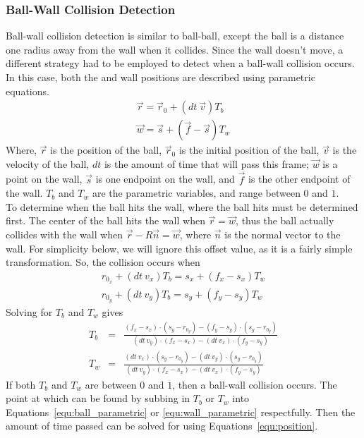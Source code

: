 \documentclass[12pt]{article}
\begin{document}
            \subsubsection{Ball-Wall Collision Detection}
            Ball-wall collision detection is similar to ball-ball, except the ball is a distance one radius away from the wall when it collides.
            Since the wall doesn't move, a different strategy had to be employed to detect when a ball-wall collision occurs. In this case,
            both the and wall positions are described using parametric equations.
            \begin{eqnarray}
                \vec r = \vec r_0 + (dt~\vec v) T_b         \label{equ:ball_parametric} \\
                \vec w = \vec s + (\vec f - \vec s) T_w     \label{equ:wall_parametric}
            \end{eqnarray}
            Where, $\vec r$ is the position of the ball, $\vec r_0$ is the initial position of the ball, $\vec v$ is the velocity of the ball,
            $dt$ is the amount of time that will pass this frame; $\vec w$ is a point on the wall, $\vec s$ is one endpoint on the wall, and $\vec f$
            is the other endpoint of the wall. $T_b$ and $T_w$ are the parametric variables, and range between $0$ and $1$. \\
            To determine when the ball hits the wall, where the ball hits must be determined first. The center of the ball hits the wall when
            $\vec r = \vec w$, thus the ball actually collides with the wall when $\vec r - R \vec n = \vec w$, where $\vec n$ is the normal
            vector to the wall. For simplicity below, we will ignore this offset value, as it is a fairly simple transformation. So, the collision
            occurs when
            \begin{eqnarray}
                r_{0_x} + (dt~v_x) T_b = s_x + (f_x - s_x) T_w  \nonumber \\
                r_{0_y} + (dt~v_y) T_b = s_y + (f_y - s_y) T_w  \nonumber
            \end{eqnarray}
            Solving for $T_b$ and $T_w$ gives
            \begin{eqnarray}
                T_b &=& \frac{(f_x - s_x)\cdot(s_y - r_{0_y}) - (f_y - s_y)\cdot(s_y - r_{0_y})}{(dt~v_y)\cdot(f_x - s_x) - (dt~v_x)\cdot(f_y - s_y)} \nonumber \\
                T_w &=& \frac{(dt~v_x)\cdot(s_y - r_{0_y}) - (dt~v_y)\cdot(s_y - r_{0_y})}{(dt~v_y)\cdot(f_x - s_x) - (dt~v_x)\cdot(f_y - s_y)} \nonumber
            \end{eqnarray}
            If both $T_b$ and $T_w$ are between $0$ and $1$, then a ball-wall collision occurs. The point at which can be found by subbing in $T_b$ or $T_w$
            into Equations~\ref{equ:ball_parametric} or \ref{equ:wall_parametric} respectfully. Then the amount of time passed can be solved for using Equations~\ref{equ:position}.
        
\end{document}
